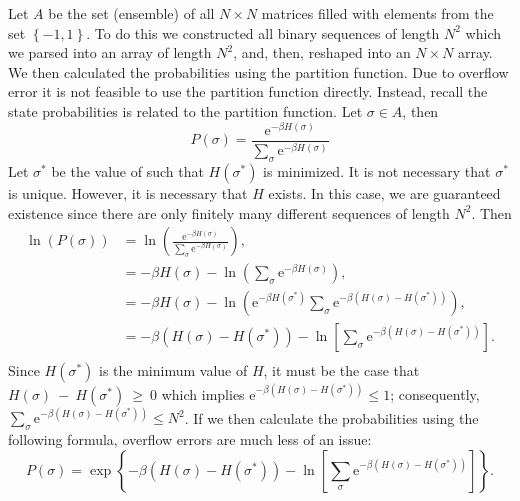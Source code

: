 \documentclass{llncs}
\newcommand{\ee}[1]{\ensuremath{\textrm{e}^{#1}}}
\begin{document}
Let $A$ be the set (ensemble) of all $N\times N$ matrices filled with elements from the set $\left\{-1,1\right\}$. To do this we constructed all binary sequences of length $N^2$ which we parsed into an array of length $N^2$, and, then, reshaped into an $N\times N$ array. We then calculated the probabilities using the partition function. Due to overflow error it is not feasible to use the partition function directly. Instead, recall the state probabilities is related to the partition function. Let $\sigma\in A$, then 
\begin{equation}
	P(\sigma) = \frac{\ee{-\beta H(\sigma)}}{\sum_{\sigma}\ee{-\beta H(\sigma)}}
\end{equation}
Let $\sigma^*$ be the value of such that $H(\sigma^*)$ is minimized. It is not necessary that $\sigma^*$ is unique. However, it is necessary that $H$ exists. In this case, we are guaranteed existence since there are only finitely many different sequences of length $N^2$. Then 
\begin{align}
\ln(P(\sigma)) &= \ln\left(\frac{\ee{-\beta H(\sigma)}}{\sum_{\sigma}\ee{-\beta H(\sigma)}}\right)\nonumber,\\
&= -\beta H(\sigma)-\ln\left(\sum_{\sigma}\ee{-\beta H(\sigma)}\right)\nonumber,\\
&= -\beta H(\sigma)-\ln\left(\ee{-\beta H(\sigma^*)}\sum_{\sigma}\ee{-\beta (H(\sigma)-H(\sigma^*))}\right)\nonumber,\\
&= -\beta (H(\sigma)-H(\sigma^*))-\ln\left[\sum_{\sigma}\ee{-\beta (H(\sigma)-H(\sigma^*))}\right].\\
\end{align}
Since $H(\sigma^*)$ is the minimum value of $H$, it must be the case that $H(\sigma)~-~H(\sigma^*)~\geq~0$ which implies $\ee{-\beta(H(\sigma)-H(\sigma^*))}\leq 1$; consequently, $\sum_{\sigma}\ee{-\beta (H(\sigma)-H(\sigma^*))}\leq N^2$. If we then calculate the probabilities using the following formula, overflow errors are much less of an issue:
\begin{equation}
P(\sigma) = \exp\left\{-\beta (H(\sigma)-H(\sigma^*))-\ln\left[\sum_{\sigma}\ee{-\beta (H(\sigma)-H(\sigma^*))}\right]\right\}.
\end{equation}
\end{document}
